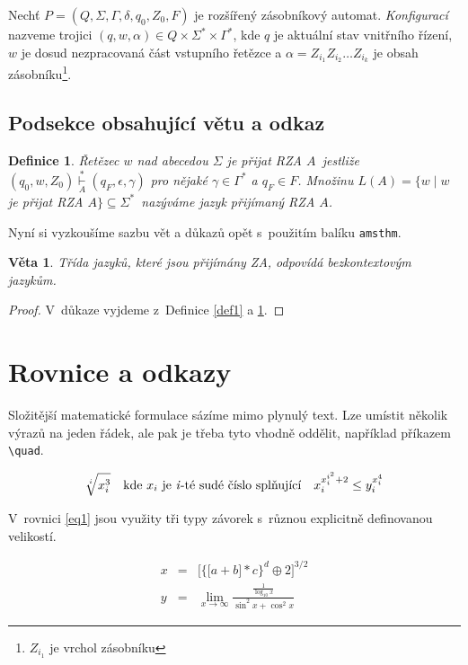 \documentclass[a4paper, 11pt,twocolumn]{article}
\newtheorem{definition}{Definice}
\newtheorem{sentence}{Věta}
\begin{document}
Nechť $P = (Q, \Sigma, \Gamma, \delta, q_0, Z_0, F)$ je rozšířený zásobníkový automat. \emph{Konfigurací} nazveme trojici $(q, w, \alpha) \in Q \times \Sigma^\ast \times \Gamma^\ast$, kde $q$ je aktuální stav vnitřního řízení, $w$ je dosud nezpracovaná část vstupního řetězce a $\alpha = Z_{i_1}Z_{i_2} \dots Z_{i_k}$ je obsah zásobníku\footnote{$Z_{i_1}$ je vrchol zásobníku}.

\subsection{Podsekce obsahující větu a odkaz}

\begin{definition}
\label{def2}
\emph{Řetězec} $w$ \emph{nad abecedou} $\Sigma$ \emph{je přijat RZA} $A$~jestliže $(q_0, w, Z_0) \overset{*}{\underset{A}{\vdash}} (q_F ,\epsilon, \gamma)$ pro nějaké $\gamma \in \Gamma^\ast$ a $q_F \in  F$. Množinu $ L (A) = \{w \mid w$ je přijat RZA $A\} \subseteq \Sigma^\ast$~nazýváme \emph{jazyk přijímaný RZA $A$.}
\end{definition} 

Nyní si vyzkoušíme sazbu vět a důkazů opět s~použitím
balíku \verb|amsthm|.

\begin{sentence}
Třída jazyků, které jsou přijímány ZA, odpovídá \emph{bezkontextovým jazykům}.
\end{sentence}

\begin{proof}
 V~důkaze vyjdeme z~Definice \ref{def1} a \ref{def2}.
\end{proof}

\section{Rovnice a odkazy}

Složitější matematické formulace sázíme mimo plynulý text. Lze umístit několik výrazů na jeden řádek, ale pak je třeba tyto vhodně oddělit, například příkazem \verb|\quad|.


$$\sqrt[i]{x_i^3} \text{\quad kde } x_i \text{ je \emph{i}-té sudé číslo splňující\quad} x^{x_i^{i^2}+2}_i \leq y_i^{x_i^4}$$


V~rovnici \eqref{eq1} jsou využity tři typy závorek s~různou explicitně definovanou velikostí.

\begin{eqnarray}
\label{eq1}
 x &=& \bigg[\Big\{\big[ a + b \big]\ast c\Big\}^d \oplus 2 \bigg]^{3/2}\\
 y &=& \lim_{x\to\infty} \frac{\frac{1}{\log_{10} x}}{\sin^2x + \cos^2x} \nonumber
\end{eqnarray}
\end{document}
